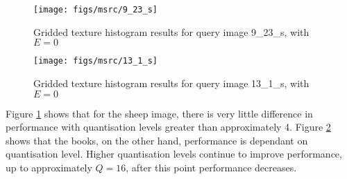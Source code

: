 \begin{figure}[ht]
	\begin{minipage}[]{0.3\linewidth}
		\centering
		\texttt{[image: figs/msrc/9\_23\_s]}
	\end{minipage}
	\begin{minipage}[]{0.7\linewidth}
		\centering
		\prplotclose
	\end{minipage}
	\caption{Gridded texture histogram results for query image 9\_23\_s, with $E=0$}
	\label{fig:grid-text-sheep}
\end{figure}

\begin{figure}[ht]
	\begin{minipage}[]{0.3\linewidth}
		\centering
		\texttt{[image: figs/msrc/13\_1\_s]}
	\end{minipage}
	\begin{minipage}[]{0.7\linewidth}
		\centering
		\prplotclose
	\end{minipage}
	\caption{Gridded texture histogram results for query image 13\_1\_s, with $E=0$}
	\label{fig:grid-text-books}
\end{figure}

Figure \ref{fig:grid-text-sheep} shows that for the sheep image, there is very little difference in performance with quantisation levels greater than approximately 4. Figure \ref{fig:grid-text-books} shows that the books, on the other hand, performance is dependant on quantisation level. Higher quantisation levels continue to improve performance, up to approximately $Q=16$, after this point performance decreases.

